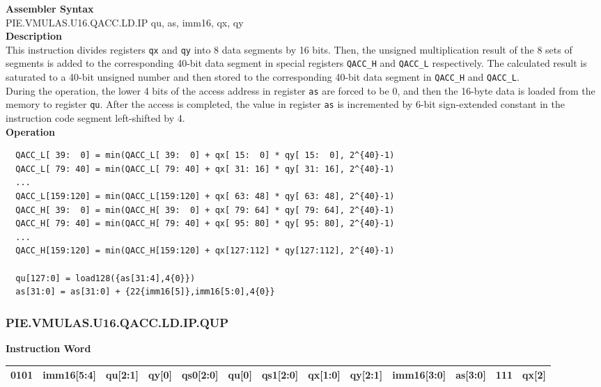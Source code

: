 \textbf{Assembler Syntax} \\
PIE.VMULAS.U16.QACC.LD.IP qu, as, imm16, qx, qy \\
\textbf{Description} \\
This instruction divides registers \lstinline{qx} and \lstinline{qy} into 8 data segments by 16 bits. Then, the unsigned multiplication result of the 8 sets of segments is added to the corresponding 40-bit data segment in special registers \lstinline{QACC_H} and \lstinline{QACC_L} respectively. The calculated result is saturated to a 40-bit unsigned number and then stored to the corresponding 40-bit data segment in \lstinline{QACC_H} and \lstinline{QACC_L}.\\
During the operation, the lower 4 bits of the access address in register \lstinline{as} are forced to be 0, and then the 16-byte data is loaded from the memory to register \lstinline{qu}. After the access is completed, the value in register \lstinline{as} is incremented by 6-bit sign-extended constant in the instruction code segment left-shifted by 4.\\
\textbf{Operation}
\begin{lstlisting}
  QACC_L[ 39:  0] = min(QACC_L[ 39:  0] + qx[ 15:  0] * qy[ 15:  0], 2^{40}-1)
  QACC_L[ 79: 40] = min(QACC_L[ 79: 40] + qx[ 31: 16] * qy[ 31: 16], 2^{40}-1)
  ...
  QACC_L[159:120] = min(QACC_L[159:120] + qx[ 63: 48] * qy[ 63: 48], 2^{40}-1)
  QACC_H[ 39:  0] = min(QACC_H[ 39:  0] + qx[ 79: 64] * qy[ 79: 64], 2^{40}-1)
  QACC_H[ 79: 40] = min(QACC_H[ 79: 40] + qx[ 95: 80] * qy[ 95: 80], 2^{40}-1)
  ...
  QACC_H[159:120] = min(QACC_H[159:120] + qx[127:112] * qy[127:112], 2^{40}-1)

  qu[127:0] = load128({as[31:4],4{0}})
  as[31:0] = as[31:0] + {22{imm16[5]},imm16[5:0],4{0}}
\end{lstlisting}

\newpage
\subsubsection{PIE.VMULAS.U16.QACC.LD.IP.QUP}\label{instruction:PIEVMULASU16QACCLDIPQUP}
\setlength\tabcolsep{5pt}
\textbf{Instruction Word} \\
\begin{tabular}{|c|c|c|c|c|c|c|c|c|c|c|c|c|}
	\hline
	0101 & imm16[5:4] & qu[2:1] & qy[0] & qs0[2:0] & qu[0] & qs1[2:0] & qx[1:0] & qy[2:1] & imm16[3:0] & as[3:0] & 111 & qx[2] \\
	\hline
\end{tabular}

